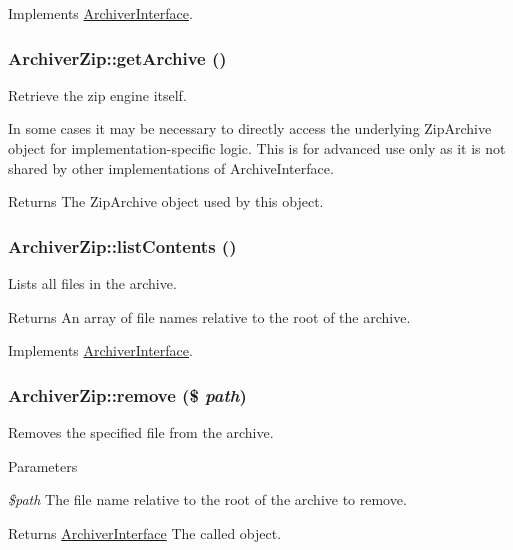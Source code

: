 Implements \hyperlink{interfaceArchiverInterface_aedd1c39f36b45e2f12381003d83ee4bf}{ArchiverInterface}.\hypertarget{classArchiverZip_af7d03221d37135adda736c7364610fc4}{
\subsubsection[{getArchive}]{\setlength{\rightskip}{0pt plus 5cm}ArchiverZip::getArchive ()}}
\label{classArchiverZip_af7d03221d37135adda736c7364610fc4}
Retrieve the zip engine itself.

In some cases it may be necessary to directly access the underlying ZipArchive object for implementation-\/specific logic. This is for advanced use only as it is not shared by other implementations of ArchiveInterface.

\begin{DoxyReturn}{Returns}
The ZipArchive object used by this object. 
\end{DoxyReturn}
\hypertarget{classArchiverZip_ad4d1065b4609b607195c87d432f440f7}{
\subsubsection[{listContents}]{\setlength{\rightskip}{0pt plus 5cm}ArchiverZip::listContents ()}}
\label{classArchiverZip_ad4d1065b4609b607195c87d432f440f7}
Lists all files in the archive.

\begin{DoxyReturn}{Returns}
An array of file names relative to the root of the archive. 
\end{DoxyReturn}


Implements \hyperlink{interfaceArchiverInterface_a0be527152061af9bfd22a525fc29d78d}{ArchiverInterface}.\hypertarget{classArchiverZip_af19c19d199c96acfd65a08ccfb7ea406}{
\subsubsection[{remove}]{\setlength{\rightskip}{0pt plus 5cm}ArchiverZip::remove (\$ {\em path})}}
\label{classArchiverZip_af19c19d199c96acfd65a08ccfb7ea406}
Removes the specified file from the archive.


\begin{DoxyParams}{Parameters}
\item[{\em \$path}]The file name relative to the root of the archive to remove.\end{DoxyParams}
\begin{DoxyReturn}{Returns}
\hyperlink{interfaceArchiverInterface}{ArchiverInterface} The called object. 
\end{DoxyReturn}



